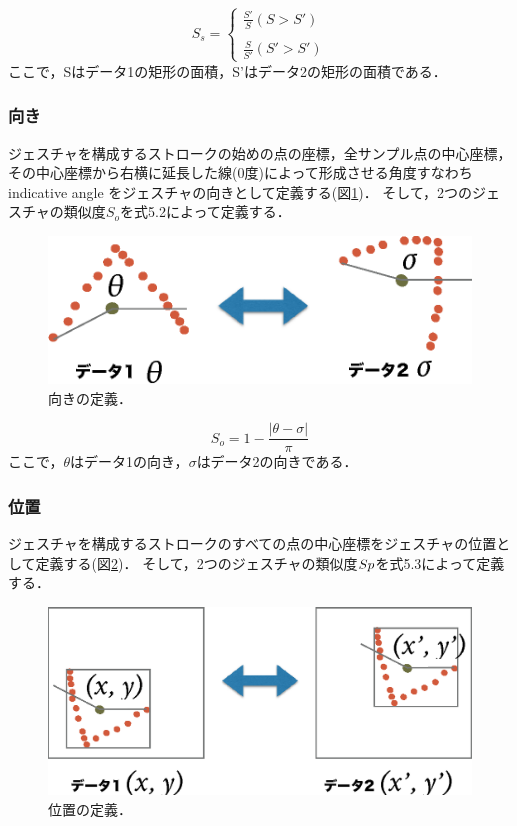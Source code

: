 \begin{equation}
S_\textit{s} = \left \{
\begin{array}{l}
\frac{S'}{S} (S>S') \\\\
\frac{S}{S'} (S'>S')
\end{array}
\right.
\end{equation}
ここで，Sはデータ1の矩形の面積，S'はデータ2の矩形の面積である．

\subsubsection{向き}
ジェスチャを構成するストロークの始めの点の座標，全サンプル点の中心座標，その中心座標から右横に延長した線(0度)によって形成させる角度すなわち indicative angle をジェスチャの向きとして定義する(図\ref{fig:v_orientation})．
そして，2つのジェスチャの類似度$S_\textit{o}$を式5.2によって定義する．

\begin{figure} [h!]
	\begin{center}
		\includegraphics [width=0.6\hsize ]{img/v_orientation.eps}
	\end{center}
	\caption{向きの定義．}
	\label{fig:v_orientation}
\end{figure}

\begin{equation}
S_\textit{o} = 1 - \frac{|\theta - \sigma|}{\pi}
\end{equation}
ここで，$\theta$はデータ1の向き，$\sigma$はデータ2の向きである．


\subsubsection{位置}
ジェスチャを構成するストロークのすべての点の中心座標をジェスチャの位置として定義する(図\ref{fig:v_position})．
そして，2つのジェスチャの類似度$S{\scriptsize p}$を式5.3によって定義する．

\begin{figure} [h!]
	\begin{center}
		\includegraphics [width=0.6\hsize ]{img/v_position.eps}
	\end{center}
	\caption{位置の定義．}
	\label{fig:v_position}
\end{figure}


